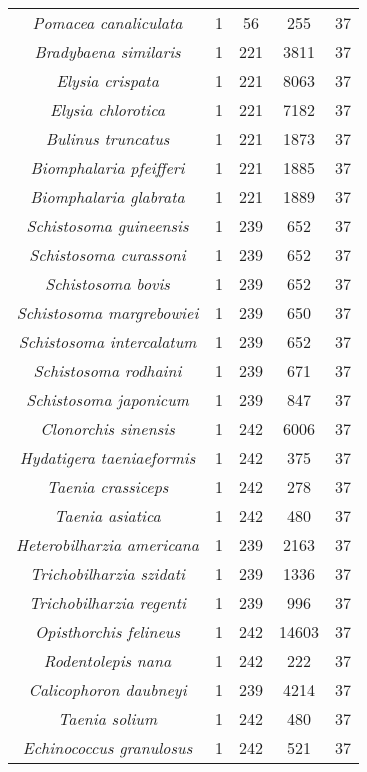\begin{longtable}[c]{|c|c|c|c|c|}
\textit{Pomacea canaliculata}      & 1  & 56  & 255   & 37 \\
\textit{Bradybaena similaris}      & 1  & 221 & 3811  & 37 \\
\textit{Elysia crispata}           & 1  & 221 & 8063  & 37 \\
\textit{Elysia chlorotica}         & 1  & 221 & 7182  & 37 \\
\textit{Bulinus truncatus}         & 1  & 221 & 1873  & 37 \\
\textit{Biomphalaria pfeifferi}    & 1  & 221 & 1885  & 37 \\
\textit{Biomphalaria glabrata}     & 1  & 221 & 1889  & 37 \\
\textit{Schistosoma guineensis}    & 1  & 239 & 652   & 37 \\
\textit{Schistosoma curassoni}     & 1  & 239 & 652   & 37 \\
\textit{Schistosoma bovis}         & 1  & 239 & 652   & 37 \\
\textit{Schistosoma margrebowiei}  & 1  & 239 & 650   & 37 \\
\textit{Schistosoma intercalatum}  & 1  & 239 & 652   & 37 \\
\textit{Schistosoma rodhaini}      & 1  & 239 & 671   & 37 \\
\textit{Schistosoma japonicum}     & 1  & 239 & 847   & 37 \\
\textit{Clonorchis sinensis}       & 1  & 242 & 6006  & 37 \\
\textit{Hydatigera taeniaeformis}  & 1  & 242 & 375   & 37 \\
\textit{Taenia crassiceps}         & 1  & 242 & 278   & 37 \\
\textit{Taenia asiatica}           & 1  & 242 & 480   & 37 \\
\textit{Heterobilharzia americana} & 1  & 239 & 2163  & 37 \\
\textit{Trichobilharzia szidati}   & 1  & 239 & 1336  & 37 \\
\textit{Trichobilharzia regenti}   & 1  & 239 & 996   & 37 \\
\textit{Opisthorchis felineus}     & 1  & 242 & 14603 & 37 \\
\textit{Rodentolepis nana}         & 1  & 242 & 222   & 37 \\
\textit{Calicophoron daubneyi}     & 1  & 239 & 4214  & 37 \\
\textit{Taenia solium}             & 1  & 242 & 480   & 37 \\
\textit{Echinococcus granulosus}   & 1  & 242 & 521   & 37 \\

\end{longtable}
